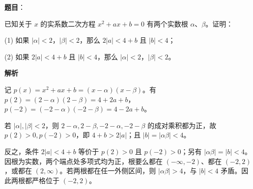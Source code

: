 \begin{answer}

\textbf{题目}：

已知关于 $x$ 的实系数二次方程 $x^2+ax+b=0$ 有两个实数根 $\alpha\text{、}\beta$。证明：

(1) 如果 $|\alpha|<2$，$|\beta|<2$，那么 $2|a|<4+b$ 且 $|b|<4$；

(2) 如果 $2|a|<4+b$ 且 $|b|<4$，那么 $|\alpha|<2$，$|\beta|<2$。

\textbf{解析}


记 $p(x)=x^2+ax+b=(x-\alpha)(x-\beta)$。有 $p(2)=(2-\alpha)(2-\beta)=4+2a+b$，$p(-2)=(-2-\alpha)(-2-\beta)=4-2a+b$。

若 $|\alpha|,|\beta|<2$，则 $2-\alpha,2-\beta,-2-\alpha,-2-\beta$ 的成对乘积都为正，故 $p(2)>0,p(-2)>0$，即 $4+b>2|a|$；且 $|b|=|\alpha\beta|<4$。


反之，条件 $2|a|<4+b$ 等价于 $p(2)>0$ 且 $p(-2)>0$；另有 $|\alpha\beta|=|b|<4$。因根为实数，两个端点处多项式均为正，根要么都在 $(-\infty,-2)$、都在 $(-2,2)$，或都在 $(2,\infty)$。若两根都在任一外侧区间，则 $|\alpha\beta|>4$，与 $|b|<4$ 矛盾。因此两根都严格位于 $(-2,2)$。



\end{answer}